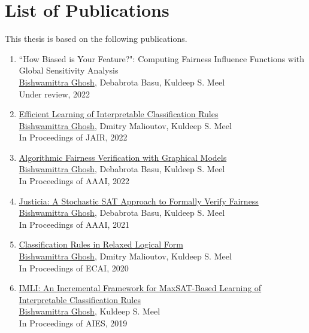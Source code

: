 
\section*{List of Publications}
This thesis is based on the following publications.

\begin{enumerate}
	
	\item ``How Biased is Your Feature?": Computing Fairness Influence Functions with Global Sensitivity Analysis\\
	\underline{Bishwamittra Ghosh}, Debabrota Basu, Kuldeep S. Meel\\
	Under review, 2022
	
	\item \href{https://arxiv.org/pdf/2205.06936.pdf}{Efficient Learning of Interpretable Classification Rules} \\
	\underline{Bishwamittra Ghosh}, Dmitry Malioutov, Kuldeep S. Meel\\
	In Proceedings of JAIR, 2022
	
	\item \href{https://arxiv.org/pdf/2109.09447.pdf}{Algorithmic Fairness Verification with Graphical Models} \\
	\underline{Bishwamittra Ghosh}, Debabrota Basu, Kuldeep S. Meel\\
	In Proceedings of AAAI, 2022
		
	\item \href{https://arxiv.org/pdf/2009.06516.pdf}{Justicia: A Stochastic SAT Approach to Formally Verify Fairness} \\
	\underline{Bishwamittra Ghosh}, Debabrota Basu, Kuldeep S. Meel\\
	In Proceedings of AAAI, 2021
	
	
	\item \href{https://bishwamittra.github.io/publication/ecai_2020/paper.pdf}{Classification Rules in Relaxed Logical Form
	} \\
	\underline{Bishwamittra Ghosh}, Dmitry Malioutov, Kuldeep S. Meel\\
	In Proceedings of ECAI, 2020
	
	\item \href{https://bishwamittra.github.io/publication/imli-ghosh.pdf}{IMLI: An Incremental Framework for MaxSAT-Based Learning of Interpretable Classification Rules}\\
	\underline{Bishwamittra Ghosh}, Kuldeep S. Meel\\
	In Proceedings of AIES, 2019
	
	
\end{enumerate}
\clearpage
